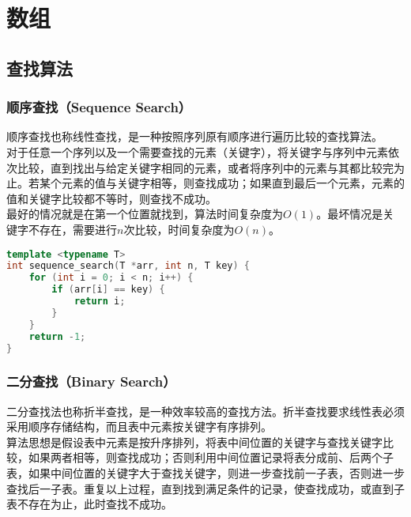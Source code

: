 \chapter{数组}

\section{查找算法}

\subsection{顺序查找（Sequence Search）}

顺序查找也称线性查找，是一种按照序列原有顺序进行遍历比较的查找算法。\\

对于任意一个序列以及一个需要查找的元素（关键字），将关键字与序列中元素依次比较，直到找出与给定关键字相同的元素，或者将序列中的元素与其都比较完为止。若某个元素的值与关键字相等，则查找成功；如果直到最后一个元素，元素的值和关键字比较都不等时，则查找不成功。\\

最好的情况就是在第一个位置就找到，算法时间复杂度为$ O(1) $。最坏情况是关键字不存在，需要进行$ n $次比较，时间复杂度为$ O(n) $。\\


\begin{lstlisting}[language=C++]
template <typename T>
int sequence_search(T *arr, int n, T key) {
    for (int i = 0; i < n; i++) {
        if (arr[i] == key) {
            return i;
        }
    }
    return -1;
}
\end{lstlisting}

\vspace{0.5cm}

\subsection{二分查找（Binary Search）}

二分查找法也称折半查找，是一种效率较高的查找方法。折半查找要求线性表必须采用顺序存储结构，而且表中元素按关键字有序排列。\\

算法思想是假设表中元素是按升序排列，将表中间位置的关键字与查找关键字比较，如果两者相等，则查找成功；否则利用中间位置记录将表分成前、后两个子表，如果中间位置的关键字大于查找关键字，则进一步查找前一子表，否则进一步查找后一子表。重复以上过程，直到找到满足条件的记录，使查找成功，或直到子表不存在为止，此时查找不成功。\\

